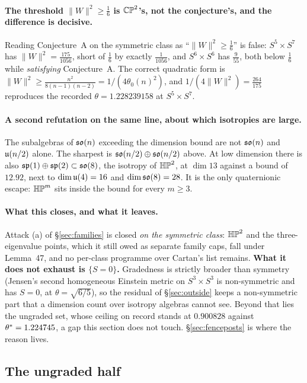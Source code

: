 \paragraph{The threshold $\|W\|^2\ge\tfrac16$ is $\mathbb{CP}^2$'s, not the conjecture's, and the difference is decisive.} Reading Conjecture~A on the symmetric class as ``$\|W\|^2\ge\tfrac16$'' is false: $S^5\times S^7$ has $\|W\|^2=\tfrac{175}{1056}$, short of $\tfrac16$ by exactly $\tfrac1{1056}$, and $S^6\times S^6$ has $\tfrac9{55}$, both below $\tfrac16$ while \emph{satisfying} Conjecture~A. The correct quadratic form is $\|W\|^2\ge\tfrac{n^2}{8(n-1)(n-2)}=1/(4\theta_0(n)^2)$, and $1/(4\|W\|^2)=\tfrac{264}{175}$ reproduces the recorded $\theta=1.228239158$ at $S^5\times S^7$.

\paragraph{A second refutation on the same line, about which isotropies are large.} The subalgebras of $\mathfrak{so}(n)$ exceeding the dimension bound are not $\mathfrak{so}(n)$ and $\mathfrak{u}(n/2)$ alone. The sharpest is $\mathfrak{so}(n/2)\oplus\mathfrak{so}(n/2)$ above. At low dimension there is also $\mathfrak{sp}(1)\oplus\mathfrak{sp}(2)\subset\mathfrak{so}(8)$, the isotropy of $\mathbb{HP}^2$, at $\dim13$ against a bound of $12.92$, next to $\dim\mathfrak{u}(4)=16$ and $\dim\mathfrak{so}(8)=28$. It is the only quaternionic escape: $\mathbb{HP}^m$ sits inside the bound for every $m\ge3$.

\paragraph{What this closes, and what it leaves.} Attack (a) of \S\ref{sec:families} is closed \emph{on the symmetric class}: $\mathbb{HP}^2$ and the three-eigenvalue points, which it still owed as separate family caps, fall under Lemma~47, and no per-class programme over Cartan's list remains. \textbf{What it does not exhaust is $\{S=0\}$.} Gradedness is strictly broader than symmetry (Jensen's second homogeneous Einstein metric on $S^3\times S^3$ is non-symmetric and has $S=0$, at $\theta=\sqrt{6/5}$), so the residual of \S\ref{sec:outside} keeps a non-symmetric part that a dimension count over isotropy algebras cannot see. Beyond that lies the ungraded set, whose ceiling on record stands at $0.900828$ against $\theta^{*}=1.224745$, a gap this section does not touch. \S\ref{sec:fenceposts} is where the reason lives.

\subsection{The ungraded half}\label{sec:ungraded}

